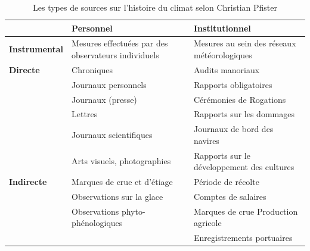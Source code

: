 \documentclass[a4paper,twoside,12pt]{article}
\begin{document}
\begin{table}[h!]
    \centering
    \begin{tabular}{p{} | >{\raggedright\arraybackslash}p{} | >{\raggedright\arraybackslash}p{}}
        & \textbf{Personnel} &     \textbf{Institutionnel} \\
\midrule

\textbf{Instrumental} & Mesures effectuées par des \newline observateurs individuels & Mesures au sein des \newline réseaux météorologiques \\
\midrule                

\textbf{Directe} &                                         Chroniques &                                   Audits manoriaux \\
                             &             Journaux personnels  &                              Rapports obligatoires \\
                             &                                  Journaux (presse) &                            Cérémonies de Rogations \\
                             &                                            Lettres &                          Rapports sur les dommages \\
                             &                             Journaux scientifiques &                       Journaux de bord des navires \\
                             &                        Arts visuels, photographies &         Rapports sur le développement des cultures \\
\midrule                             

\textbf{Indirecte} &                   Marques de crue et d'étiage  &             Période de récolte \\
                             &            Observations sur la glace &                                Comptes de salaires \\
                             &                        Observations phyto-\newline phénologiques &                                    Marques de crue \newline Production agricole \\
                             & &  Enregistrements portuaires \\
                             
\bottomrule
\end{tabular}
    \caption{Les types de sources sur l'histoire du climat selon Christian Pfister}
    \label{tab:source_types}
\end{table}
\end{document}
